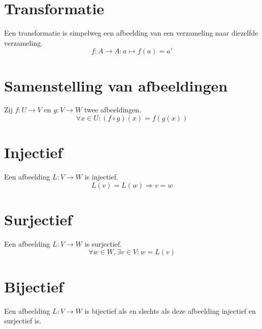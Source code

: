 \documentclass[lineaire_algebra_oplossingen.tex]{subfiles}
\begin{document}
\section{Transformatie}
Een transformatie is simpelweg een afbeelding van een verzameling naar diezelfde verzameling.
\[
f : A \rightarrow A : a \mapsto f(a)=a'
\]

\section{Samenstelling van afbeeldingen}
\label{samenstelling_van_afbeeldingen}
Zij $f: U \rightarrow V$ en $g: V\rightarrow W$ twee afbeeldingen.
\[
\forall x\in U: (f \circ g)(x) = f(g(x))
\]

\section{Injectief}
\label{injectief}
Een afbeelding $L: V \rightarrow W$ is injectief.
\[
L(v) = L(w) \Rightarrow v = w
\]

\section{Surjectief}
\label{surjectief}
Een afbeelding $L: V \rightarrow W$ is surjectief.
\[
\forall w \in W, \exists v \in V: w=L(v)
\]

\section{Bijectief}
\label{bijectief}
Een afbeelding $L: V \rightarrow W$ is bijectief als en slechts als deze afbeelding injectief en surjectief is.
\end{document}
